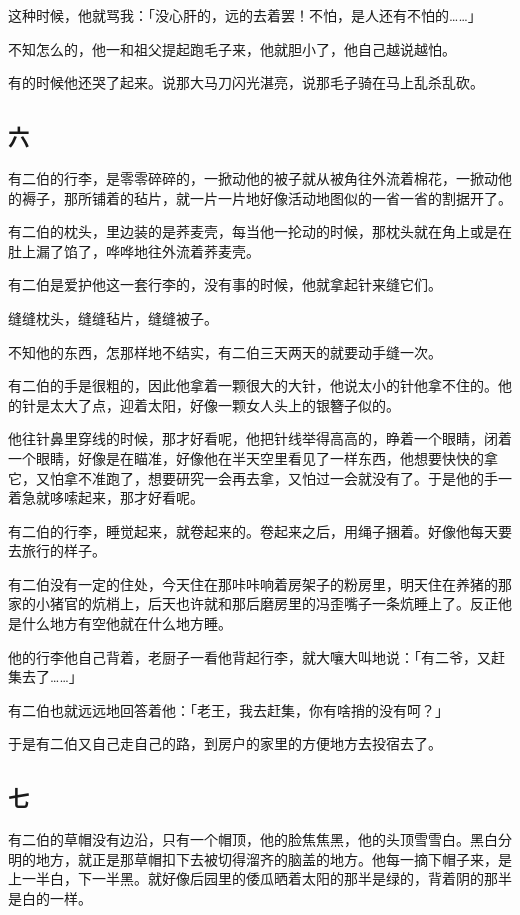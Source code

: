 \documentclass[UTF8]{ctexart}
\begin{document}
这种时候，他就骂我：「没心肝的，远的去着罢！不怕，是人还有不怕的……」

不知怎么的，他一和祖父提起跑毛子来，他就胆小了，他自己越说越怕。

有的时候他还哭了起来。说那大马刀闪光湛亮，说那毛子骑在马上乱杀乱砍。

\subsection{六}

有二伯的行李，是零零碎碎的，一掀动他的被子就从被角往外流着棉花，一掀动他的褥子，那所铺着的毡片，就一片一片地好像活动地图似的一省一省的割据开了。

有二伯的枕头，里边装的是荞麦壳，每当他一抡动的时候，那枕头就在角上或是在肚上漏了馅了，哗哗地往外流着荞麦壳。

有二伯是爱护他这一套行李的，没有事的时候，他就拿起针来缝它们。

缝缝枕头，缝缝毡片，缝缝被子。

不知他的东西，怎那样地不结实，有二伯三天两天的就要动手缝一次。

有二伯的手是很粗的，因此他拿着一颗很大的大针，他说太小的针他拿不住的。他的针是太大了点，迎着太阳，好像一颗女人头上的银簪子似的。

他往针鼻里穿线的时候，那才好看呢，他把针线举得高高的，睁着一个眼睛，闭着一个眼睛，好像是在瞄准，好像他在半天空里看见了一样东西，他想要快快的拿它，又怕拿不准跑了，想要研究一会再去拿，又怕过一会就没有了。于是他的手一着急就哆嗦起来，那才好看呢。

有二伯的行李，睡觉起来，就卷起来的。卷起来之后，用绳子捆着。好像他每天要去旅行的样子。

有二伯没有一定的住处，今天住在那咔咔响着房架子的粉房里，明天住在养猪的那家的小猪官的炕梢上，后天也许就和那后磨房里的冯歪嘴子一条炕睡上了。反正他是什么地方有空他就在什么地方睡。

他的行李他自己背着，老厨子一看他背起行李，就大嚷大叫地说：「有二爷，又赶集去了……」

有二伯也就远远地回答着他：「老王，我去赶集，你有啥捎的没有呵？」

于是有二伯又自己走自己的路，到房户的家里的方便地方去投宿去了。

\subsection{七}

有二伯的草帽没有边沿，只有一个帽顶，他的脸焦焦黑，他的头顶雪雪白。黑白分明的地方，就正是那草帽扣下去被切得溜齐的脑盖的地方。他每一摘下帽子来，是上一半白，下一半黑。就好像后园里的倭瓜晒着太阳的那半是绿的，背着阴的那半是白的一样。
\end{document}
